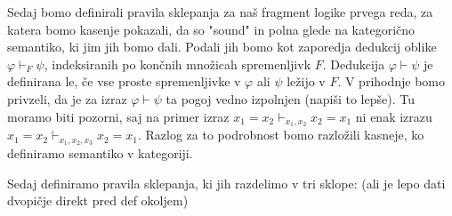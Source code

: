 \documentclass[../kategoricna_logika.tex]{subfiles}
\begin{document}
Sedaj bomo definirali pravila sklepanja za naš fragment logike prvega reda, za katera bomo kasenje pokazali, da so "sound" in polna glede na kategorično semantiko, ki jim jih bomo dali.
Podali jih bomo kot zaporedja dedukcij oblike $\varphi \vdash_F \psi$, indeksiranih po končnih množicah spremenljivk $F$. Dedukcija $\varphi \vdash \psi$ je definirana le, če vse proste spremenljivke v $\varphi$ ali $\psi$ ležijo v $F$. V prihodnje bomo privzeli, da je za izraz $\varphi \vdash \psi$ ta pogoj vedno izpolnjen (napiši to lepše).
Tu moramo biti pozorni, saj na primer izraz $x_1 = x_2 \vdash_{x_1, x_2} x_2 = x_1$ ni enak izrazu $x_1 = x_2 \vdash_{x_1, x_2, x_3} x_2 = x_1$. Razlog za to podrobnost bomo razložili kasneje, ko definiramo semantiko v kategoriji.

Sedaj definiramo pravila sklepanja, ki jih razdelimo v tri sklope: (ali je lepo dati dvopičje direkt pred def okoljem)
\end{document}
